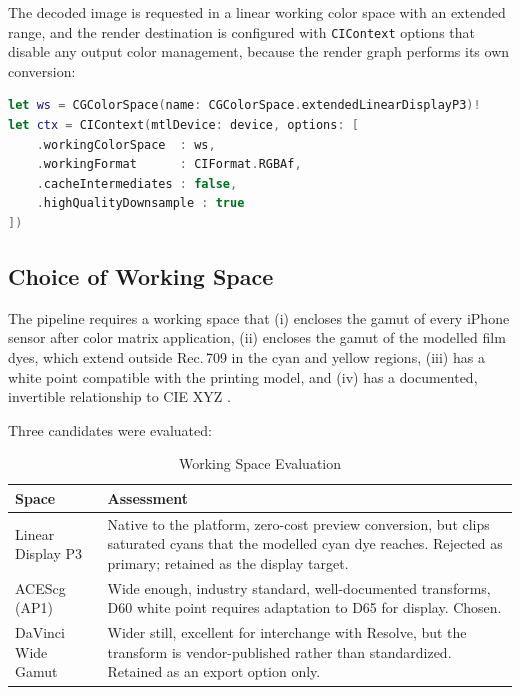 The decoded image is requested in a linear working color space with an
extended range, and the render destination is configured with
\texttt{CIContext} options that disable any output color management, because
the render graph performs its own conversion:

\begin{lstlisting}[language=Swift, caption={Context configuration for linear extended-range output.}]
let ws = CGColorSpace(name: CGColorSpace.extendedLinearDisplayP3)!
let ctx = CIContext(mtlDevice: device, options: [
    .workingColorSpace  : ws,
    .workingFormat      : CIFormat.RGBAf,
    .cacheIntermediates : false,
    .highQualityDownsample : true
])
\end{lstlisting}

\subsection{Choice of Working Space}

The pipeline requires a working space that (i) encloses the gamut of every
iPhone sensor after color matrix application, (ii) encloses the gamut of the
modelled film dyes, which extend outside Rec.\,709 in the cyan and yellow
regions, (iii) has a white point compatible with the printing model, and (iv)
has a documented, invertible relationship to CIE XYZ \cite{hunt2011}.

Three candidates were evaluated:

\begin{table}[htbp]
\caption{Working Space Evaluation}
\label{tab:workingspace}
\begin{center}
\renewcommand{\arraystretch}{1.15}
\begin{tabularx}{\columnwidth}{@{}l>{\raggedright\arraybackslash}X@{}}
\toprule
\textbf{Space} & \textbf{Assessment} \\
\midrule
Linear Display P3 & Native to the platform, zero-cost preview conversion, but clips saturated cyans that the modelled cyan dye reaches. Rejected as primary; retained as the display target. \\
ACEScg (AP1) & Wide enough, industry standard, well-documented transforms, D60 white point requires adaptation to D65 for display. Chosen. \\
DaVinci Wide Gamut & Wider still, excellent for interchange with Resolve, but the transform is vendor-published rather than standardized. Retained as an export option only. \\
\bottomrule
\end{tabularx}
\end{center}
\end{table}

